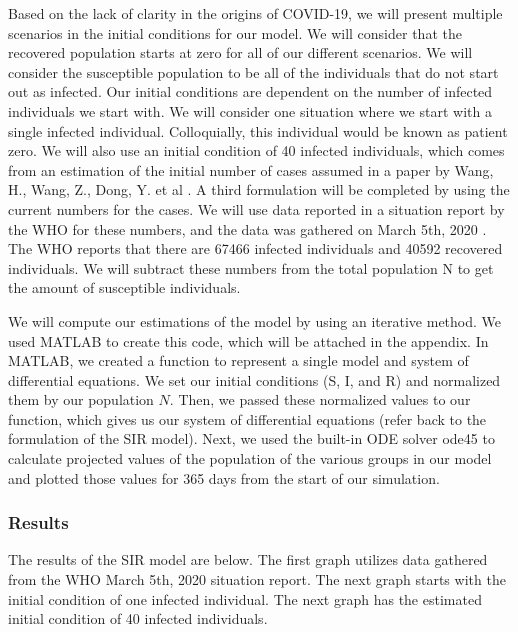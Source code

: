 \documentclass[12pt, a4paper]{article}
\begin{document}
        Based on the lack of clarity in the origins of COVID-19, we will present multiple scenarios in the initial conditions for our model. We will consider that the recovered population starts at zero for all of our different scenarios. We will consider the susceptible population to be all of the individuals that do not start out as infected. Our initial conditions are dependent on the number of infected individuals we start with. We will consider one situation where we start with a single infected individual. Colloquially, this individual would be known as patient zero. We will also use an initial condition of 40 infected individuals, which comes from an estimation of the initial number of cases assumed in a paper by Wang, H., Wang, Z., Dong, Y. et al \cite{parameter}. A third formulation will be completed by using the current numbers for the cases. We will use data reported in a situation report by the WHO for these numbers, and the data was gathered on March 5th, 2020 \cite{who}. The WHO reports that there are 67466 infected individuals and 40592 recovered individuals. We will subtract these numbers from the total population N to get the amount of susceptible individuals.
        
        We will compute our estimations of the model by using an iterative method. We used MATLAB to create this code, which will be attached in the appendix. In MATLAB, we created a function to represent a single model and system of differential equations. We set our initial conditions (S, I, and R) and normalized them by our population $N$. Then, we passed these normalized values to our function, which gives us our system of differential equations (refer back to the formulation of the SIR model). Next, we used the built-in ODE solver ode45 to calculate projected values of the population of the various groups in our model and plotted those values for 365 days from the start of our simulation.
        
        \subsubsection{Results}
        
        The results of the SIR model are below. The first graph utilizes data gathered from the WHO March 5th, 2020 situation report. The next graph starts with the initial condition of one infected individual. The next graph has the estimated initial condition of 40 infected individuals.
        
\end{document}
